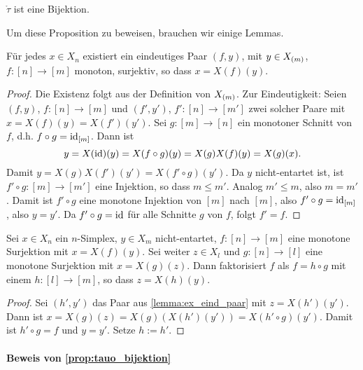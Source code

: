 \begin{prop}
  \label{prop:tauo_bijektion} 
  $\mathring\tau$ ist eine Bijektion.
\end{prop}

Um diese Proposition zu beweisen, brauchen wir einige Lemmas.

\begin{lemma}
  \label{lemma:ex_eind_paar}
  Für jedes $x \in X_n$ existiert ein eindeutiges Paar $(f,y)$, mit
  $y \in X_{(m)}$, $f:[n]\to[m]$ monoton, surjektiv, so dass $x = X(f)(y)$.
\end{lemma}
\begin{proof}
  Die Existenz folgt aus der Definition von $X_{(m)}$.
  Zur Eindeutigkeit: Seien $(f,y)$, $f:[n]\to[m]$ und $(f',y')$,
  $f':[n]\to [m']$ zwei solcher Paare mit $x = X(f)(y) = X(f')(y')$.
  Sei $g:[m]\to[n]$ ein monotoner Schnitt von $f$, d.h. 
  $f\circ g = \operatorname{id}_{[m]}$. Dann ist 
  \[ y = X(\operatorname{id})(y) = X(f\circ g)(y) = X(g)X(f)(y) = X(g)(x). \]
  Damit $y = X(g)X(f')(y') = X(f'\circ g)(y')$.
  Da $y$ nicht-entartet ist, ist $f'\circ g:[m]\to [m']$ eine Injektion, so
  dass $m\leq m'$. Analog $m'\leq m$, also $m = m'$. Damit ist
  $f'\circ g$ eine monotone Injektion von $[m]$ nach $[m]$, also
  $f'\circ g = \operatorname{id}_{[m]}$, also $y = y'$. Da $f'\circ g = \operatorname{id}$ für alle
  Schnitte $g$ von $f$, folgt $f' = f$.
\end{proof}


\begin{folgerung}
  \label{folgerung:aufteilen_in_surj_inj}
  Sei $x \in X_n$ ein $n$-Simplex, $y\in X_m$ nicht-entartet, 
  $f:[n]\to[m]$ eine monotone Surjektion mit $x = X(f)(y)$. Sei weiter 
  $z \in X_l$ und $g: [n]\to[l]$ eine monotone Surjektion mit $x=X(g)(z)$. Dann
  faktorisiert $f$ als $f = h\circ g$ mit einem $h:[l]\to[m]$, so dass
  $z = X(h)(y)$.
\end{folgerung}
\begin{proof}
  Sei $(h',y')$ das Paar aus \cref{lemma:ex_eind_paar} mit $z = X(h')(y')$.
  Dann ist $x = X(g)(z) = X(g)(X(h')(y')) = X(h'\circ g)(y')$. Damit ist
  $h'\circ g = f$ und $y = y'$. Setze $h:= h'$.
\end{proof}

\paragraph{Beweis von \cref{prop:tauo_bijektion}}

